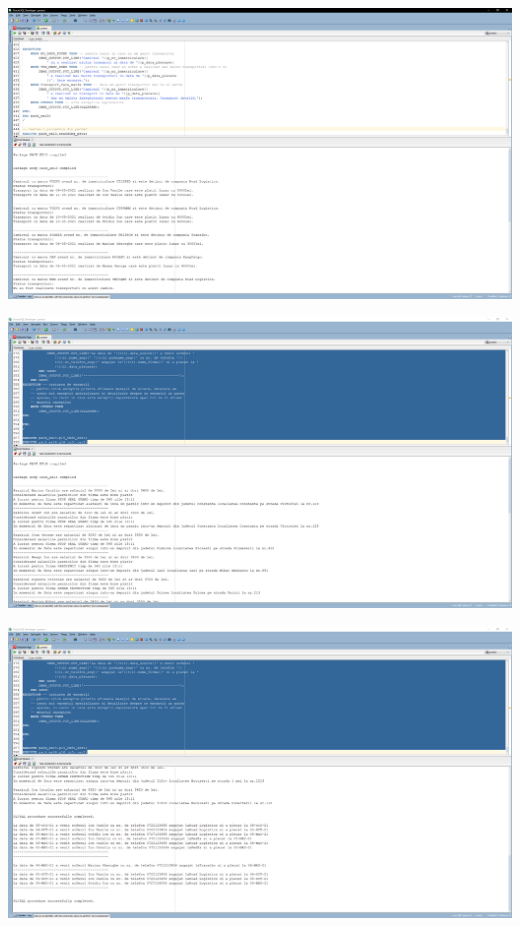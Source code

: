 \documentclass[12pt, a4paper]{article}
\begin{document}
\includegraphics[width=\textwidth]{13.png}

\includegraphics[width=\textwidth]{14_1.png}

\includegraphics[width=\textwidth]{14_2.png}
\end{document}
